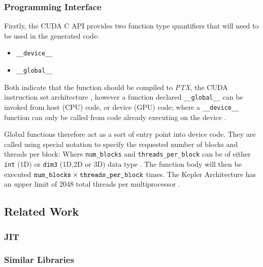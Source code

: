 \subsubsection{Programming Interface}
Firstly, the CUDA C API provides two function type quantifiers that will need to be used in the generated code:
\begin{itemize}
\vspace{-.5cm}
\setlength{\itemsep}{0pt}%
\setlength{\parskip}{0pt}%
\item{\verb|__device__|}
\item{\verb|__global__|}
\vspace{-.5cm}
\end{itemize}
Both indicate that the function should be compiled to \textit{PTX}, the CUDA instruction set architecture \cite[p15]{guide}, however a function declared \verb|__global__| can be invoked from host (CPU) code,  or device (GPU) code; where a \verb|__device__| function can only be called from code already executing on the device \cite[p81]{guide}.
\par
Global functions therefore act as a sort of entry point into device code. They are called using special notation to specify the requested number of blocks and threads per block:
Where \verb|num_blocks| and \verb|threads_per_block| can be of either \verb|int| (1D) or \verb|dim3| (1D,2D or 3D) data type \cite[p9]{guide}. The function body will then be executed $\verb|num_blocks| \times  \verb|threads_per_block|$ times. The Kepler Architecture has an upper limit of 2048 total threads per multiprocessor \cite{kepler}. 


\subsection{Related Work}

\subsubsection{JIT}
\label{sec:rw_JIT}

\subsubsection{Similar Libraries}
